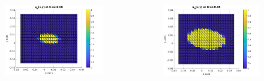 \documentclass[8pt]{beamer}
\begin{document}
\begin{frame}
\begin{columns}
		\begin{column}{0.25\textwidth}
			\begin{figure}[h]
				\includegraphics[width=\textwidth]{tc1-2/006.jpg}
			\end{figure}
		\end{column}
		\begin{column}{0.25\textwidth}
			\begin{figure}[h]
				\includegraphics[width=\textwidth]{tc1-2/008.jpg}
			\end{figure}
		\end{column}
	\end{columns}
	\begin{columns}
		\begin{column}{0.25\textwidth}

\end{column}
\end{columns}
\end{frame}
\end{document}
